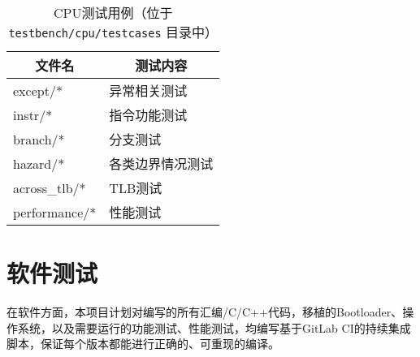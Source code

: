 \begin{table}[!htbp]
\centering
\caption{CPU测试用例（位于 \texttt{testbench/cpu/testcases} 目录中）}
\label{table:cpu_testbenches}
\begin{threeparttable}
\begin{tabular}{|l|l|}
\hline
\multicolumn{1}{|c|}{\textbf{文件名}} & \multicolumn{1}{c|}{\textbf{测试内容}}                                                                                        \\ \hline
except/*              & 异常相关测试          \\ \hline                           
instr/*              & 指令功能测试          \\ \hline                           
branch/*              & 分支测试          \\ \hline                              
hazard/*              & 各类边界情况测试          \\ \hline                      
across\_tlb/*              & TLB测试          \\ \hline                          
performance/*              & 性能测试          \\ \hline                                   \end{tabular}
\end{threeparttable}
\end{table}

\section{软件测试}

在软件方面，本项目计划对编写的所有汇编/C/C++代码，移植的Bootloader、操作系统，以及需要运行的功能测试、性能测试，均编写基于GitLab CI的持续集成脚本，保证每个版本都能进行正确的、可重现的编译。